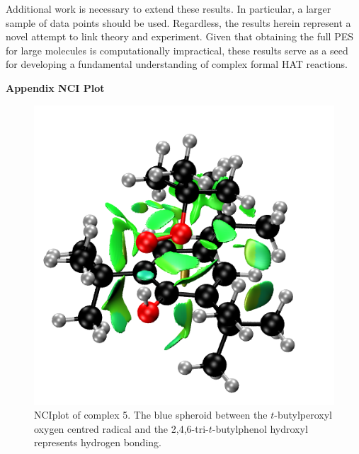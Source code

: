 Additional work is necessary to extend these results. In particular, a larger sample of data points should be used. Regardless, the results herein represent a novel attempt to link theory and experiment. Given that obtaining the full PES for large molecules is computationally impractical, these results serve as a seed for developing a fundamental understanding of complex formal HAT reactions.

\newpage
\noindent \textbf{Appendix NCI Plot}
\begin{figure}[htb]
  \centering
  \includegraphics[width=\textwidth]{figures/nciplot.png}
  \caption{NCIplot\cite{Johnson2010,ContrerasGarcia2011} of complex 5. The blue spheroid between the $t$-butylperoxyl oxygen centred radical and the 2,4,6-tri-$t$-butylphenol hydroxyl represents hydrogen bonding.}
\end{figure}
